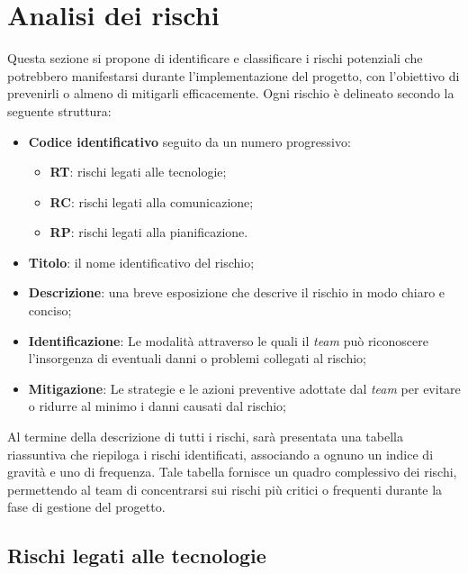 \section{Analisi dei rischi}

Questa sezione si propone di identificare e classificare i rischi potenziali 
che potrebbero manifestarsi durante l'implementazione del progetto, 
con l'obiettivo di prevenirli o almeno di mitigarli efficacemente. 
Ogni rischio è delineato secondo la seguente struttura:
\begin{itemize}
	\item \textbf{Codice identificativo} seguito da un numero progressivo:
	      \begin{itemize}
		      \item \textbf{RT}: rischi legati alle tecnologie;
		      \item \textbf{RC}: rischi legati alla comunicazione;
		      \item \textbf{RP}: rischi legati alla pianificazione.
	      \end{itemize}

	\item \textbf{Titolo}: il nome identificativo del rischio;

	\item \textbf{Descrizione}: una breve esposizione che descrive il rischio in modo chiaro e conciso;

	\item \textbf{Identificazione}: Le modalità attraverso le quali il \textit{team} può riconoscere 
		l'insorgenza di eventuali danni o problemi collegati al rischio;

	\item \textbf{Mitigazione}: Le strategie e le azioni preventive adottate dal 
		\textit{team} per evitare o ridurre al minimo i danni causati dal rischio;
\end{itemize}

Al termine della descrizione di tutti i rischi, sarà presentata una tabella riassuntiva 
che riepiloga i rischi identificati, associando a ognuno un indice di gravità e uno di frequenza. 
Tale tabella fornisce un quadro complessivo dei rischi, 
permettendo al team di concentrarsi sui rischi più critici o 
frequenti durante la fase di gestione del progetto.


\subsection{Rischi legati alle tecnologie}








